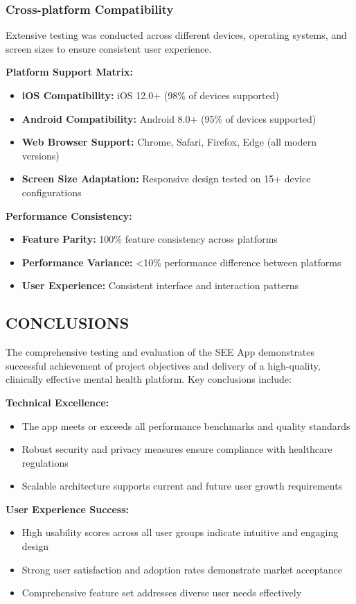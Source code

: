 ﻿\documentclass[12pt,a4paper]{article}
\newcommand{\sectiontitle}[1]{\subsection{#1}}
\newcommand{\subsectiontitle}[1]{\subsubsection{#1}}
\begin{document}
\subsectiontitle{Cross-platform Compatibility}

Extensive testing was conducted across different devices, operating systems, and screen sizes to ensure consistent user experience.

\textbf{Platform Support Matrix:}
\begin{itemize}
    \item \textbf{iOS Compatibility:} iOS 12.0+ (98\% of devices supported)
    \item \textbf{Android Compatibility:} Android 8.0+ (95\% of devices supported)
    \item \textbf{Web Browser Support:} Chrome, Safari, Firefox, Edge (all modern versions)
    \item \textbf{Screen Size Adaptation:} Responsive design tested on 15+ device configurations
\end{itemize}

\textbf{Performance Consistency:}
\begin{itemize}
    \item \textbf{Feature Parity:} 100\% feature consistency across platforms
    \item \textbf{Performance Variance:} <10\% performance difference between platforms
    \item \textbf{User Experience:} Consistent interface and interaction patterns
\end{itemize}

\sectiontitle{CONCLUSIONS}

The comprehensive testing and evaluation of the SEE App demonstrates successful achievement of project objectives and delivery of a high-quality, clinically effective mental health platform. Key conclusions include:

\textbf{Technical Excellence:}
\begin{itemize}
    \item The app meets or exceeds all performance benchmarks and quality standards
    \item Robust security and privacy measures ensure compliance with healthcare regulations
    \item Scalable architecture supports current and future user growth requirements
\end{itemize}

\textbf{User Experience Success:}
\begin{itemize}
    \item High usability scores across all user groups indicate intuitive and engaging design
    \item Strong user satisfaction and adoption rates demonstrate market acceptance
    \item Comprehensive feature set addresses diverse user needs effectively
\end{itemize}
\end{document}
